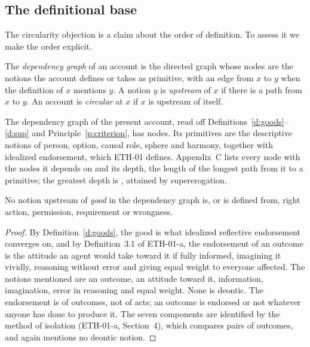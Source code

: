 \documentclass{situationist-preprint}
\begin{document}
\subsection{The definitional base}

The circularity objection is a claim about the order of definition. To assess it we make the order explicit.

\begin{definition}\label{d:graph}
The \emph{dependency graph} of an account is the directed graph whose nodes are the notions the account defines or takes as primitive, with an edge from $x$ to $y$ when the definition of $x$ mentions $y$. A notion $y$ is \emph{upstream} of $x$ if there is a path from $x$ to $y$. An account is \emph{circular} at $x$ if $x$ is upstream of itself.
\end{definition}

The dependency graph of the present account, read off Definitions~\ref{d:goods}--\ref{d:sup} and Principle~\ref{p:criterion}, has \stngraphnodes{} nodes. Its primitives are the descriptive notions of person, option, causal role, sphere and harmony, together with idealized endorsement, which ETH-01 defines. Appendix~C lists every node with the nodes it depends on and its depth, the length of the longest path from it to a primitive; the greatest depth is \stngraphdepth{}, attained by supererogation.

\begin{lemma}\label{l:goods}
No notion upstream of \emph{good} in the dependency graph is, or is defined from, right action, permission, requirement or wrongness.
\end{lemma}

\begin{proof}
By Definition~\ref{d:goods}, the good is what idealized reflective endorsement converges on, and by Definition~3.1 of ETH-01-a, the endorsement of an outcome is the attitude an agent would take toward it if fully informed, imagining it vividly, reasoning without error and giving equal weight to everyone affected. The notions mentioned are an outcome, an attitude toward it, information, imagination, error in reasoning and equal weight. None is deontic. The endorsement is of outcomes, not of acts; an outcome is endorsed or not whatever anyone has done to produce it. The seven components are identified by the method of isolation (ETH-01-a, Section~4), which compares pairs of outcomes, and again mentions no deontic notion.
\end{proof}
\end{document}
